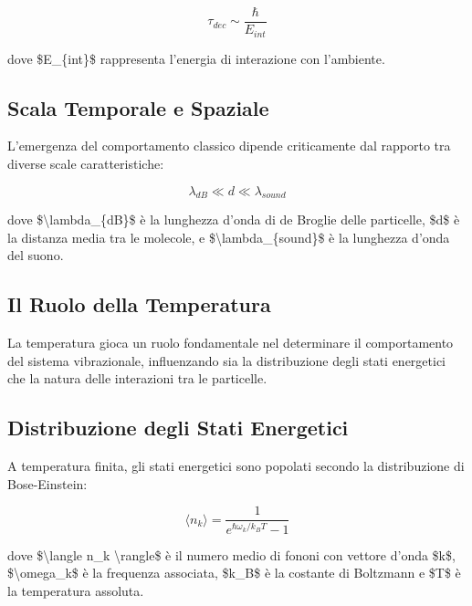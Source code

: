 \documentclass[a4paper,11pt]{article}
\begin{document}
\begin{displaymath}
\tau_{dec} \sim \frac{\hbar}{E_{int}}
\end{displaymath}

dove \$E\_\{int\}\$ rappresenta l'energia di interazione con l'ambiente.

\subsection{Scala Temporale e Spaziale}\hypertarget{scala-temporale-e-spaziale}{}\label{scala-temporale-e-spaziale}

L'emergenza del comportamento classico dipende criticamente dal rapporto
tra diverse scale caratteristiche:

\begin{displaymath}
\lambda_{dB} \ll d \ll \lambda_{sound}
\end{displaymath}

dove \$\textbackslash{}lambda\_\{dB\}\$ è la lunghezza d'onda di de Broglie delle
particelle, \$d\$ è la distanza media tra le molecole, e \$\textbackslash{}lambda\_\{sound\}\$
è la lunghezza d'onda del suono.

\subsection{Il Ruolo della Temperatura}\hypertarget{il-ruolo-della-temperatura}{}\label{il-ruolo-della-temperatura}

La temperatura gioca un ruolo fondamentale nel determinare il
comportamento del sistema vibrazionale, influenzando sia la
distribuzione degli stati energetici che la natura delle interazioni tra
le particelle.

\subsection{Distribuzione degli Stati Energetici}\hypertarget{distribuzione-degli-stati-energetici}{}\label{distribuzione-degli-stati-energetici}

A temperatura finita, gli stati energetici sono popolati secondo la
distribuzione di Bose-Einstein:

\begin{displaymath}
\langle n_k \rangle = \frac{1}{e^{\hbar\omega_k/k_BT} - 1}
\end{displaymath}

dove \$\textbackslash{}langle n\_k \textbackslash{}rangle\$ è il numero medio di fononi con vettore
d'onda \$k\$, \$\textbackslash{}omega\_k\$ è la frequenza associata, \$k\_B\$ è la costante di
Boltzmann e \$T\$ è la temperatura assoluta.
\end{document}
